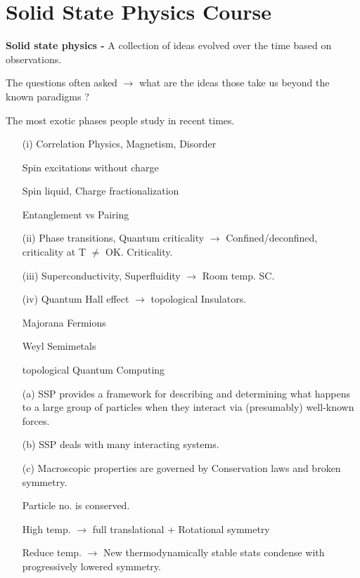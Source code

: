 \section*{Solid State Physics Course}

\textbf{Solid state physics -} A collection of ideas evolved over the time based on observations.

The questions often asked $\to$ what are the ideas those take us beyond the known paradigms ?

The most exotic phases people study in recent times.
\begin{itemize}
\item[(i)] Correlation Physics, Magnetism, Disorder

Spin excitations without charge

Spin liquid, Charge fractionalization 

Entanglement vs Pairing

\item[(ii)] Phase transitions, Quantum criticality $\to$ Confined/deconfined, criticality at T $\neq$ OK. Criticality.

\item[(iii)] Superconductivity, Superfluidity $\to$ Room temp. SC.

\item[(iv)] Quantum Hall effect $\to$ topological Insulators. 

Majorana Fermions

Weyl Semimetals

topological Quantum Computing
\end{itemize}
\begin{itemize}
\item[(a)] SSP provides a framework for describing and determining what happens to a large group of particles when they interact via (presumably) well-known forces.

\item[(b)] SSP deals with many interacting systems.

\item[(c)] Macroscopic properties are governed by Conservation laws and broken symmetry.

Particle no. is conserved.

High temp. $\to$ full translational + Rotational symmetry

Reduce temp. $\to$ New thermodynamically stable stats condense with progressively lowered symmetry.
\end{itemize}

